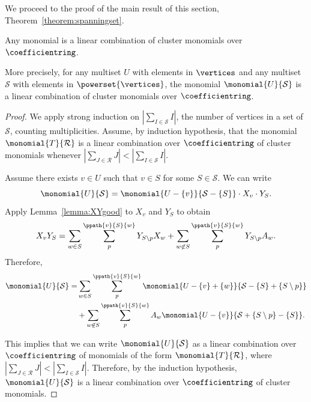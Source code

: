 We proceed to the proof of the main result of this section, Theorem~\ref{theorem:spanningset}.

\begin{theo*} \label{theorem:spanningset:repeated}
    Any monomial is a linear combination of cluster monomials over \(\coefficientring\).

    More precisely, for any multiset \(U\) with elements in \(\vertices\) and any multiset \(\mathcal{S}\) with elements in \(\powerset{\vertices}\), the monomial \(\monomial{U}{\mathcal{S}}\) is a linear combination of cluster monomials over \(\coefficientring\).
\end{theo*}

\begin{proof}
    We apply strong induction on \(\left|\sum_{I \in \mathcal{S}} I\right|\), the number of vertices in a set of \(\mathcal{S}\), counting multiplicities.
    Assume, by induction hypothesis, that the monomial \(\monomial{T}{\mathcal{R}}\) is a linear combination over \(\coefficientring\) of cluster monomials whenever \(\left|\sum_{J \in \mathcal{R}} J\right| < \left|\sum_{I \in \mathcal{S}} I\right|\).

    Assume there exists \(v \in U\) such that \(v \in S\) for some \(S \in \mathcal{S}\).
    We can write
    \begin{equation*}
        \monomial{U}{\mathcal{S}} = \monomial{U - \{v\}}{\mathcal{S} - \{S\}} \cdot X_v \cdot Y_S.
    \end{equation*}
    Apply Lemma~\ref{lemma:XYgood} to \(X_v\) and \(Y_S\) to obtain
    \begin{equation*}
        X_v Y_S =
        \sum_{w \in S}
        \sum_{p}^{\ppath{v}{S}{w}}
        Y_{S \setminus p}  X_w
        +
        \sum_{w \not\in S}
        \sum_{p}^{\ppath{v}{S}{w}}
        Y_{S \setminus p}  A_w.
    \end{equation*}
    Therefore,
    \begin{align*}
        \monomial{U}{\mathcal{S}}
        = & \sum_{w \in S}
        \sum_{p}^{\ppath{v}{S}{w}}
        \monomial{U - \{v\} + \{w\}}{\mathcal{S} - \{S\} + \{S \setminus p\}} \\
        & + 
        \sum_{w \not\in S}
        \sum_{p}^{\ppath{v}{S}{w}}
        A_w \monomial{U - \{v\}}{\mathcal{S} + \{S \setminus p\} - \{S\}}.
    \end{align*}

    This implies that we can write \(\monomial{U}{\mathcal{S}}\) as a linear combination over \(\coefficientring\) of monomials of the form \(\monomial{T}{\mathcal{R}}\),
    where \(\left|\sum_{J \in \mathcal{R}} J\right| < \left|\sum_{I \in \mathcal{S}} I\right|\).
    Therefore, by the induction hypothesis, \(\monomial{U}{\mathcal{S}}\) is a linear combination over \(\coefficientring\) of cluster monomials.


\end{proof}
